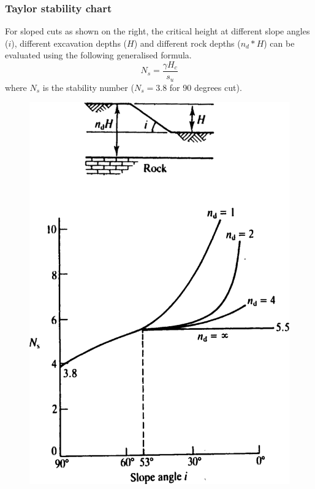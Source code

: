 \documentclass[notes]{beamer}
\begin{document}
\begin{frame}
	\frametitle{Taylor stability chart}
		\noindent
	\fboxsep=0pt
	\noindent
	\begin{minipage}[t]{0.5\linewidth}
		For sloped cuts as shown on the right, the critical height at different
slope
angles
($i$), different
		excavation depths ($H$) and
different rock depths ($n_d * H$) can
be evaluated using the following
		generalised formula.
		\begin{equation*}
			N_s = \frac{\gamma H_c}{s_u}		
		\end{equation*}
		where $N_s$ is the stability number
($N_s = 3.8$ for 90 degrees cut).
	\end{minipage}%
	\hfill
	\begin{minipage}[t]{0.5\linewidth}
	\begin{figure}
		\includegraphics[width=0.85\linewidth]{figs/taylor-slope-stability.png}
	\end{figure}

	\end{minipage}

\end{frame}
\end{document}
